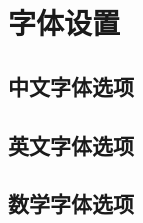 
\chapter{字体设置}
    \lipsum[1]

\section{中文字体选项}
    \lipsum[1]
\section{英文字体选项}
    \lipsum[1]
\section{数学字体选项}
    \lipsum[1]



